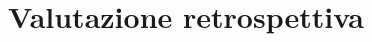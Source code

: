 \documentclass[Tesi.tex]{subfiles}
\begin{document}
\chapter{Valutazione retrospettiva}
\end{document}
